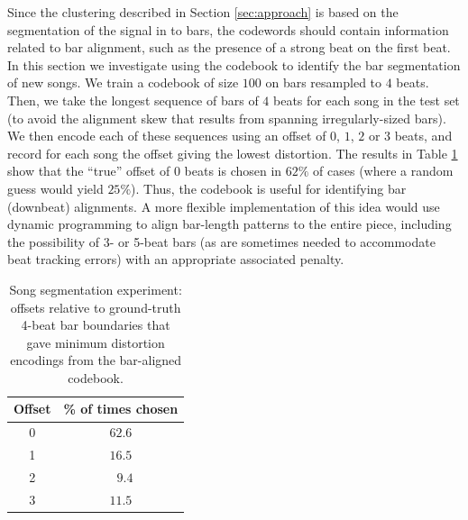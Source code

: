 \documentclass{article}
\begin{document}
Since the clustering described in Section \ref{sec:approach} is based
on the segmentation of the signal in to bars, 
the codewords should contain information related to bar
alignment, such as the presence of a strong beat on the first beat.
%
In this section we investigate using the codebook to identify the
bar segmentation of new songs.  
We train a codebook of size $100$ on bars resampled to $4$ beats. Then,
we take the longest sequence of bars of $4$ beats for each song
in the test set (to avoid the alignment skew that results from spanning 
irregularly-sized bars).  
We then encode each of these sequences using an offset
of $0$, $1$, $2$ or $3$ beats, and record for each song 
the offset giving the lowest distortion.  
%
The results in Table \ref{tab:offset}
show that the ``true'' offset of $0$ beats is chosen in $62\%$ of cases (where a random 
guess would yield $25\%$).  Thus, the codebook is useful for identifying bar (downbeat) 
alignments.  A more flexible implementation of this idea would use dynamic 
programming to align bar-length patterns to the entire piece, including the 
possibility of 3- or 5-beat bars (as are sometimes needed to accommodate 
beat tracking errors) with an appropriate associated penalty.  



\begin{table}
\begin{center}
\begin{tabular}{cc}
\toprule
Offset & \% of times chosen \\
\midrule
0 & $\mathbf{62.6}$\\
1 & $16.5$\\
2 & $\text{ }9.4$\\
3 & $11.5$\\
\bottomrule
\end{tabular}
\end{center}
\caption{\small{
Song segmentation experiment:
offsets relative to ground-truth 4-beat bar boundaries 
that gave minimum distortion encodings from the bar-aligned codebook.
}}
\label{tab:offset}
\end{table}
\end{document}
